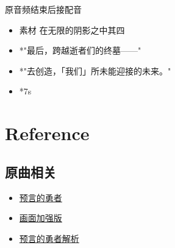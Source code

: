 \documentclass[a4paper]{article}
\begin{document}
原音频结束后接配音

\begin{itemize}
    \item 素材 在无限的阴影之中其四
    \item *"最后，跨越逝者们的终墓——"
    \item *"去创造，「我们」所未能迎接的未来。"
    \item *7s
\end{itemize}


\section{Reference}

\subsection{原曲相关}

\begin{itemize}
    \item \href{https://www.bilibili.com/video/BV1Zf4y1Z75m/}{预言的勇者}
    \item \href{https://www.bilibili.com/video/BV1rr4y177C9/}{画面加强版}
    \item \href{https://www.bilibili.com/video/BV1KT411z7Vr/}{预言的勇者解析}
\end{itemize}
\end{document}
